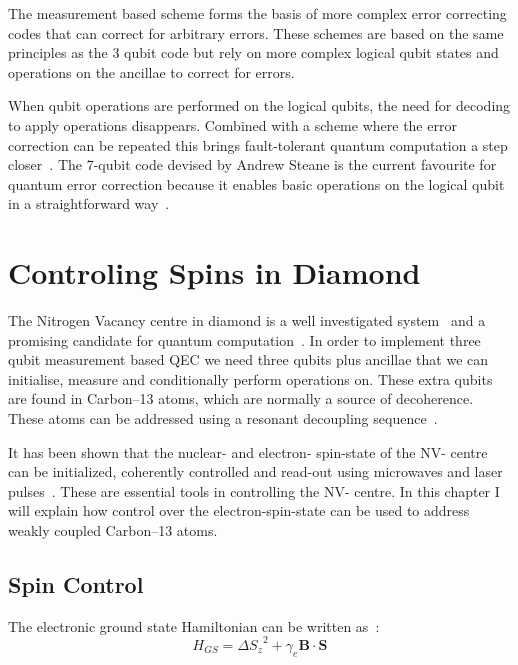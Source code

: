 The measurement based scheme forms the basis of more complex error correcting codes that can correct for arbitrary errors. These schemes are based on the same principles as the 3 qubit code but rely on more complex logical qubit states and operations on the ancillae to correct for errors. 

When qubit operations are performed on the logical qubits, the need for decoding to apply operations disappears. Combined with a scheme where the error correction can be repeated this brings fault-tolerant quantum computation a step closer~\citep{Nielsen2010}. The 7-qubit code devised by Andrew Steane is the current favourite for quantum error correction because it enables basic operations on the logical qubit in a straightforward way~\citep{Mermin2007}. 

\section{Controling Spins in Diamond}
\label{controlingspinsindiamond}

The Nitrogen Vacancy centre in diamond is a well investigated system~\citep{Doherty2013a} and a promising candidate for quantum computation~\citep{Childress2013}. In order to implement three qubit measurement based QEC we need three qubits plus ancillae that we can initialise, measure and conditionally perform operations on. These extra qubits are found in Carbon--13 atoms, which are normally a source of decoherence. These atoms can be addressed using a resonant decoupling sequence~\citep{Taminiau2012}. 

It has been shown that the nuclear- and electron- spin-state of the NV- centre can be initialized, coherently controlled and read-out using microwaves and laser pulses~\citep{Robledo2011}. These are essential tools in controlling the NV- centre. In this chapter I will explain how control over the electron-spin-state can be used to address weakly coupled Carbon--13 atoms. 

\subsection{Spin Control}
\label{spincontrol}

The electronic ground state Hamiltonian can be written as~\citep{Pfaff2013}:
 \begin{equation} 
H_{GS} = \Delta {S_z}^2 + \gamma_e \mathbf{B} \cdot \mathbf{S}
\end{equation}

